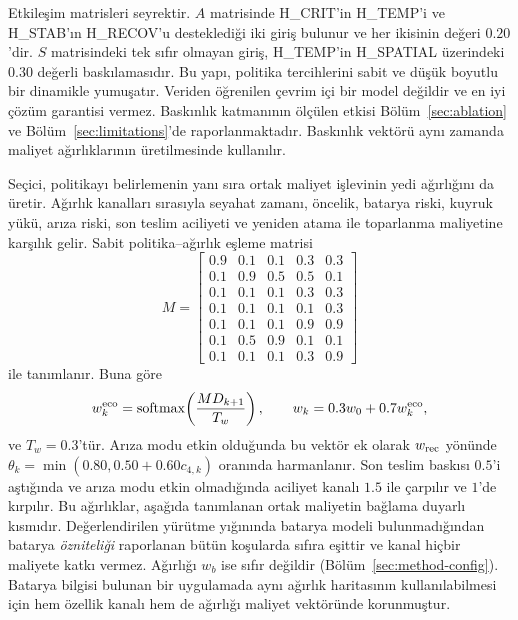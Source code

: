 \documentclass[10pt,letterpaper,onecolumn]{IEEEtran}
\begin{document}
Etkileşim matrisleri seyrektir. $A$ matrisinde H\_CRIT'in H\_TEMP'i ve
H\_STAB'ın H\_RECOV'u desteklediği iki giriş bulunur ve her ikisinin değeri
$0.20$'dir. $S$ matrisindeki tek sıfır olmayan giriş, H\_TEMP'in H\_SPATIAL
üzerindeki $0.30$ değerli baskılamasıdır. Bu yapı, politika tercihlerini sabit
ve düşük boyutlu bir dinamikle yumuşatır. Veriden öğrenilen çevrim içi bir model
değildir ve en iyi çözüm garantisi vermez. Baskınlık katmanının ölçülen etkisi
Bölüm~\ref{sec:ablation} ve Bölüm~\ref{sec:limitations}'de raporlanmaktadır.
Baskınlık vektörü aynı zamanda maliyet ağırlıklarının üretilmesinde kullanılır.

Seçici, politikayı belirlemenin yanı sıra ortak maliyet işlevinin yedi
ağırlığını da üretir. Ağırlık kanalları sırasıyla seyahat
zamanı, öncelik, batarya riski, kuyruk yükü, arıza riski, son teslim aciliyeti
ve yeniden atama ile toparlanma maliyetine karşılık gelir. Sabit politika--ağırlık
eşleme matrisi
\begin{equation}
M=\begin{bmatrix}
0.9&0.1&0.1&0.3&0.3\\
0.1&0.9&0.5&0.5&0.1\\
0.1&0.1&0.1&0.3&0.3\\
0.1&0.1&0.1&0.1&0.3\\
0.1&0.1&0.1&0.9&0.9\\
0.1&0.5&0.9&0.1&0.1\\
0.1&0.1&0.1&0.3&0.9
\end{bmatrix}
\label{eq:weight-map}
\end{equation}
ile tanımlanır. Buna göre
\begin{equation}
  w^{\rm eco}_k=\operatorname{softmax}\!\left(\frac{MD_{k+1}}{T_w}\right),
  \qquad
  w_k=0.3w_0+0.7w^{\rm eco}_k,
  \label{eq:weights}
\end{equation}
ve $T_w=0.3$'tür. Arıza modu etkin olduğunda bu vektör ek olarak
$w_{\rm rec}$ yönünde
$\theta_k=\min(0.80,0.50+0.60c_{4,k})$ oranında harmanlanır. Son teslim
baskısı $0.5$'i aştığında ve arıza modu etkin olmadığında aciliyet kanalı $1.5$ ile
çarpılır ve $1$'de kırpılır. Bu ağırlıklar, aşağıda tanımlanan ortak maliyetin
bağlama duyarlı kısmıdır. Değerlendirilen yürütme yığınında batarya modeli
bulunmadığından batarya \emph{özniteliği} raporlanan bütün koşularda
sıfıra eşittir ve kanal hiçbir maliyete katkı vermez. Ağırlığı $w_b$ ise sıfır
değildir (Bölüm~\ref{sec:method-config}). Batarya bilgisi bulunan bir
uygulamada aynı ağırlık haritasının kullanılabilmesi için hem özellik kanalı
hem de ağırlığı maliyet vektöründe korunmuştur.
\end{document}
